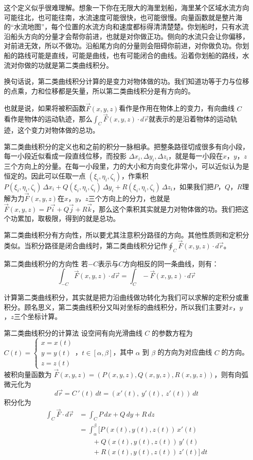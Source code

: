 这个定义似乎很难理解。想象一下你在无限大的海里划船，海里某个区域水流方向可能往北，也可能往南，水流速度可能很快，也可能很慢。向量函数就是整片海的“水流地图”，每个位置的水流方向和速度都标得清清楚楚。你划船时，只有水流沿船头方向的分量才会帮你前进，也就是对你做正功。侧向的水流只会让你偏移，对前进无效，所以不做功。沿船尾方向的分量则会阻碍你前进，对你做负功。你划船的路线可能是直线，可能是曲线，也有可能闭合的曲线。沿着你划船的路线，水流对你做的功就是第二类曲线积分。

换句话说，第二类曲线积分计算的是变力对物体做的功。我们知道功等于力与位移的点乘，力和位移都是矢量，所以第二类曲线积分是有方向的。

也就是说，如果将被积函数\(\vec{F}(x,y,z)\)看作是作用在物体上的变力，有向曲线 \(C\) 看作是物体的运动轨迹，那么\(\int_{C} \vec{F}(x,y,z) \cdot d\vec{r}\)就表示的是沿着物体的运动轨迹，这个变力对物体做的总功。

第二类曲线积分的定义也和之前的积分一脉相承。把整条路径切成很多有向小段，每一小段近似看成一段直线位移，而投影 \(\Delta x_i, \Delta y_i, \Delta z_i\)，就是每一小段在\(x\)，\(y\)，\(z\)三个方向上的分量。在每一小段里，力的大小和方向变化非常小，可以近似认为是恒定的。因此可以任取一点 \((\xi_i,\eta_i,\zeta_i)\)，作乘积\(P(\xi_i,\eta_i,\zeta_i)\,\Delta x_i + Q(\xi_i,\eta_i,\zeta_i)\,\Delta y_i + R(\xi_i,\eta_i,\zeta_i)\,\Delta z_i\)，如果我们把\(P\)，\(Q\)，\(R\)理解为力\(\vec{F}(x,y,z)\)在\(x\)，\(y\)，\(z\)三个方向上的分力，也就是\(\vec{F}(x,y,z)=P\vec{i}+Q\vec{j}+R\vec{k}\)，那么这个乘积其实就是力对物体做的功。我们把这个功累加，取极限，得到的就是总功。

第二类曲线积分有方向性，所以要尤其注意积分路径的方向。其他性质则和定积分类似。当积分路径是闭合曲线时，第二类曲线积分记作\(\oint_{C} \vec{F}(x,y,z) \cdot d\vec{r}\)。
\begin{theorem}{第二类曲线积分的方向性}{}
    若\(-C\)表示与\(C\)方向相反的同一条曲线，则有：
    \[\int_{-C} \vec{F}(x,y,z) \cdot d\vec{r}=\int_{C} -\vec{F}(x,y,z) \cdot d\vec{r}\]
\end{theorem}
计算第二类曲线积分，其实就是把力沿曲线做功转化为我们可以求解的定积分或重积分。顾名思义，第二类曲线积分又叫对坐标的曲线积分，所以我们主要对\(x\)，\(y\)，\(z\)三个坐标计算。

\begin{theorem}{第二类曲线积分的计算法}{}
设空间有向光滑曲线 \( C \) 的参数方程为  
\(
C(t) = \begin{cases}
x = x(t)\\
y = y(t)\\
z = z(t)
\end{cases}\)，\(t \in [\alpha, \beta]\)，其中 \(\alpha\) 到 \(\beta\) 的方向为对应曲线 \( C \) 的方向。被积向量函数为 \(\vec{F}(x,y,z) = (P(x,y,z), Q(x,y,z), R(x,y,z))\)，则有向弧微元化为
\[
d\vec{r} = C\,'(t)\,dt = (x'(t),\ y'(t),\ z'(t))\,dt
\]
积分化为
\[
\begin{aligned}
\int_C \vec{F} \cdot d\vec{r}
&= \int_C P\,dx + Q\,dy + R\,dz \\
&= \int_{\alpha}^{\beta} [ P(x(t),y(t),z(t))\,x'(t) \\
&\qquad + Q(x(t),y(t),z(t))\,y'(t) \\
&\qquad + R(x(t),y(t),z(t))\,z'(t) ]\,dt
\end{aligned}
\]
\end{theorem}


